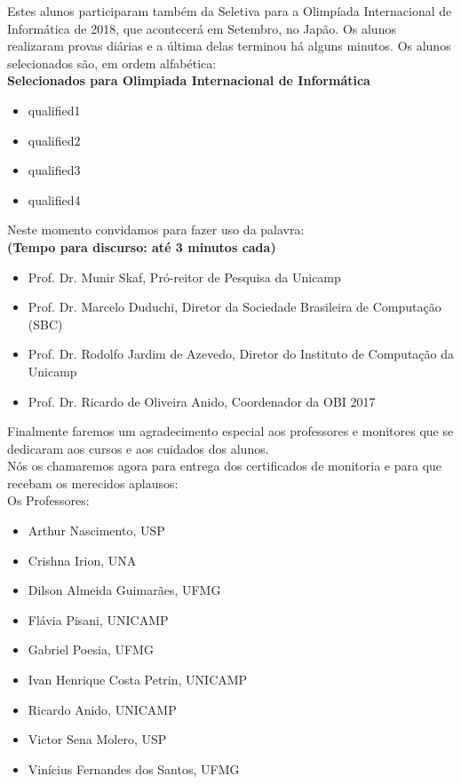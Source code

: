 \documentclass{article}
\begin{document}
Estes alunos participaram também da Seletiva para a Olimpíada Internacional de Informática de 2018, que acontecerá em Setembro, no Japão. Os alunos realizaram provas diárias e a última delas terminou há alguns minutos. Os alunos selecionados são, em ordem alfabética:\\
\color{blue}\textbf{Selecionados para Olimpiada Internacional de Informática}\color{black}

\begin{itemize}
\item qualified1
\item qualified2
\item qualified3
\item qualified4
\end{itemize}
\bigskip

Neste momento convidamos para fazer uso da palavra:\\
\color{red}\textbf{(Tempo para discurso: até 3 minutos cada)}\color{black}\
\begin{itemize}
\item Prof. Dr. Munir Skaf, Pró-reitor de Pesquisa da Unicamp
\item Prof. Dr. Marcelo Duduchi, Diretor da Sociedade Brasileira de Computação (SBC)
\item Prof. Dr. Rodolfo Jardim de Azevedo, Diretor do Instituto de Computação da Unicamp
\item Prof. Dr. Ricardo de Oliveira Anido, Coordenador da OBI 2017
\end{itemize}
\bigskip

Finalmente faremos um agradecimento especial aos professores e monitores que se dedicaram aos cursos e aos cuidados dos alunos.\\
Nós os chamaremos agora para entrega dos certificados de monitoria e para que recebam os merecidos aplausos:\\

Os Professores:

\begin{itemize}
\item Arthur Nascimento, USP
\item Crishna Irion, UNA
\item Dilson Almeida Guimarães, UFMG
\item Flávia Pisani, UNICAMP
\item Gabriel Poesia, UFMG
\item Ivan Henrique Costa Petrin, UNICAMP
\item Ricardo Anido, UNICAMP
\item Victor Sena Molero, USP
\item Vinícius Fernandes dos Santos, UFMG
\end{itemize}
\end{document}
